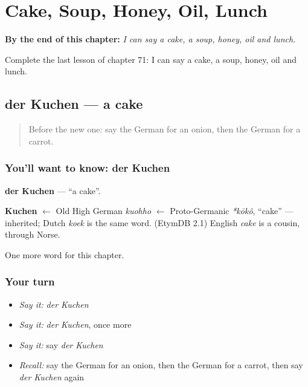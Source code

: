 
\chapter{Cake, Soup, Honey, Oil, Lunch}
\label{ch:ge-cake-soup-honey-oil-lunch}

\begin{chapteropening}
\textbf{By the end of this chapter:} \emph{I can say a cake, a soup, honey, oil and lunch.}

Complete the last lesson of chapter 71: I can say a cake, a soup, honey, oil and lunch.
\end{chapteropening}

\section[der Kuchen]{der Kuchen — a cake}

\label{lesson:GE-C71-kuchen}



\begin{quote}
Before the new one: say the German for an onion, then the German for a carrot.
\end{quote}

\subsection*{You'll want to know: der Kuchen}
\textbf{der Kuchen} — \textquotedblleft{}a cake\textquotedblright{}.

\begin{cousinweb}
\textbf{Kuchen} $\leftarrow$ Old High German \emph{kuohho} $\leftarrow$ Proto-Germanic \emph{*kōkô}, \textquotedblleft{}cake\textquotedblright{} — inherited; Dutch \emph{koek} is the same word. (EtymDB 2.1) English \emph{cake} is a cousin, through Norse.
\end{cousinweb}

\begin{grammarlens}[title={What you've built}]
One more word for this chapter.
\end{grammarlens}

\subsection*{Your turn}
\begin{itemize}
\raggedright
  \item \emph{Say it:} \emph{der Kuchen}
  \item \emph{Say it:} \emph{der Kuchen}, once more
  \item \emph{Say it:} say \emph{der Kuchen}
  \item \emph{Recall:} say the German for an onion, then the German for a carrot, then say \emph{der Kuchen} again
\end{itemize}

